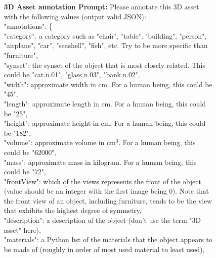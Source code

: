 \begin{figure}[!t]
    \centering
    \begin{center}
    \begin{tcolorbox} [top=2pt,bottom=2pt, width=\linewidth, boxrule=1pt]
    {\footnotesize {\selectfont
    \textbf{3D Asset annotation Prompt:}
   Please annotate this 3D asset with the following values (output valid JSON): \\
        "annotations": \{ \\
            "category": a category such as "chair", "table", "building", "person", "airplane", "car", "seashell", "fish", etc. Try to be more specific than "furniture", \\
            "synset": the synset of the object that is most closely related. This could be "cat.n.01", "glass.n.03", "bank.n.02", \\
            "width": approximate width in cm. For a human being, this could be "45", \\
            "length": approximate length in cm. For a human being, this could be "25", \\
            "height": approximate height in cm. For a human being, this could be "182", \\
            "volume": approximate volume in cm$^3$. For a human being, this could be "62000", \\
            "mass": approximate mass in kilogram. For a human being, this could be "72", \\
            "frontView": which of the views represents the front of the object (value should be an integer with the first image being 0). Note that the front view of an object, including furniture, tends to be the view that exhibits the highest degree of symmetry, \\
            "description": a description of the object (don't use the term "3D asset" here), \\
            "materials": a Python list of the materials that the object appears to be made of (roughly in order of most used material to least used), \\
}}
\end{tcolorbox}
\end{center}
\end{figure}
